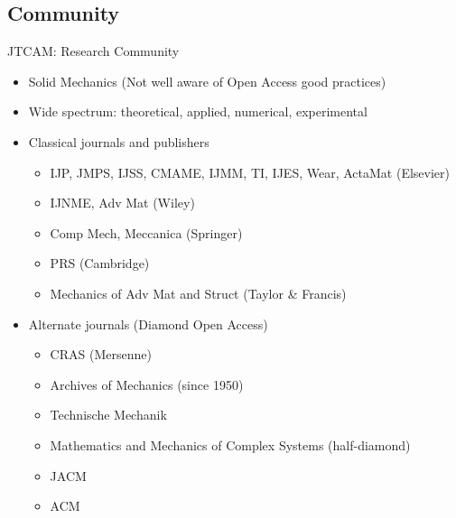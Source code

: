 \documentclass[10pt,compress,serif,aspectratio=169]{beamer}
\begin{document}
\subsection{Community}

\begin{frame}[t]{JTCAM: Research Community}
\begin{itemize}
 \item Solid Mechanics (Not well aware of Open Access good practices)
 \item Wide spectrum: theoretical, applied, numerical, experimental
 \item Classical journals and publishers
 \begin{itemize}
 \item IJP, JMPS, IJSS, CMAME, IJMM, TI, IJES, Wear, ActaMat (Elsevier)
 \item IJNME, Adv Mat (Wiley)
 \item Comp Mech, Meccanica (Springer)
 \item PRS (Cambridge)
 \item Mechanics of Adv Mat and Struct (Taylor \& Francis)
 \end{itemize}
 \item Alternate journals (Diamond Open Access)
  \begin{itemize}
 \item CRAS (Mersenne)
 \item Archives of Mechanics (since 1950)
 \item Technische Mechanik
 \item Mathematics and Mechanics of Complex Systems (half-diamond)
 \item JACM
 \item ACM
 \end{itemize}
\end{itemize}

\end{frame}

\end{document}
